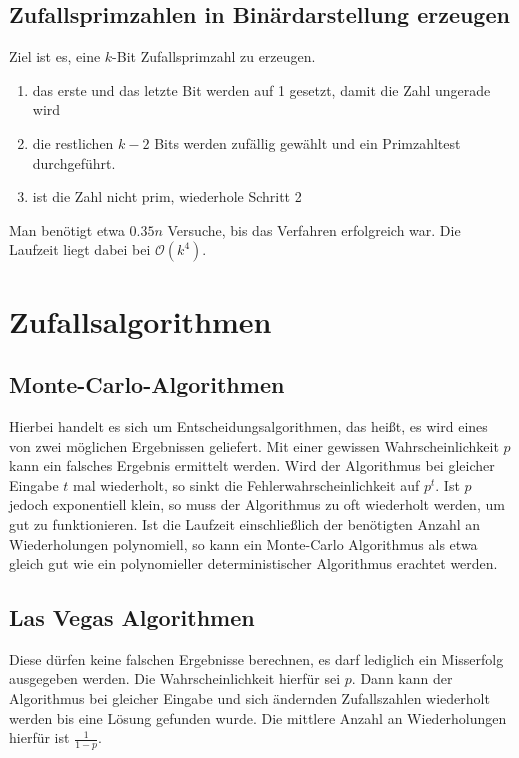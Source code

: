 \documentclass[a4paper, 12pt]{article}
\theoremstyle{plain}
\theoremstyle{definition}
\theoremstyle{lemma}
\theoremstyle{remark}
\theoremstyle{corollary}
\theoremstyle{example}
\begin{document}
	\subsection{Zufallsprimzahlen in Binärdarstellung erzeugen}
	Ziel ist es, eine $k$-Bit Zufallsprimzahl zu erzeugen.\\
	\begin{enumerate}
		\item das erste und das letzte Bit werden auf 1 gesetzt, damit die Zahl ungerade wird
		\item die restlichen $k-2$ Bits werden zufällig gewählt und ein Primzahltest durchgeführt. 
		\item ist die Zahl nicht prim, wiederhole Schritt 2
	\end{enumerate}
	Man benötigt etwa $0.35n$ Versuche, bis das Verfahren erfolgreich war. Die Laufzeit liegt dabei bei $\mathcal{O}(k^4)$.
\section{Zufallsalgorithmen}
	\subsection{Monte-Carlo-Algorithmen}
	Hierbei handelt es sich um Entscheidungsalgorithmen, das heißt, es wird eines von zwei möglichen Ergebnissen geliefert. Mit einer gewissen Wahrscheinlichkeit $p$ kann ein falsches Ergebnis ermittelt werden. Wird der Algorithmus bei gleicher Eingabe $t$ mal wiederholt, so sinkt die Fehlerwahrscheinlichkeit auf $p^t$. Ist $p$ jedoch exponentiell klein, so muss der Algorithmus zu oft wiederholt werden, um gut zu funktionieren. Ist die Laufzeit einschließlich der benötigten Anzahl an Wiederholungen polynomiell, so kann ein Monte-Carlo Algorithmus als etwa gleich gut wie ein polynomieller deterministischer Algorithmus erachtet werden.
	\subsection{Las Vegas Algorithmen}
	Diese dürfen keine falschen Ergebnisse berechnen, es darf lediglich ein Misserfolg ausgegeben werden. Die Wahrscheinlichkeit hierfür sei $p$. Dann kann der Algorithmus bei gleicher Eingabe und sich ändernden Zufallszahlen wiederholt werden bis eine Lösung gefunden wurde. Die mittlere Anzahl an Wiederholungen hierfür ist $\frac{1}{1-p}$. 
\end{document}
